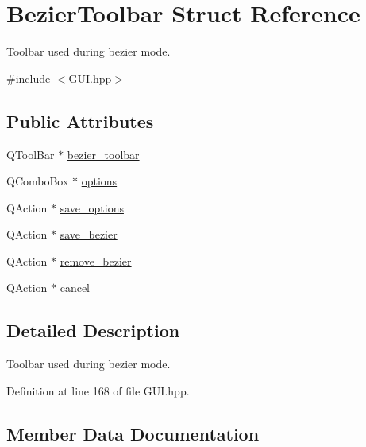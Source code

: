 \hypertarget{structBezierToolbar}{}\section{Bezier\+Toolbar Struct Reference}
\label{structBezierToolbar}


Toolbar used during bezier mode.  




{\ttfamily \#include $<$G\+U\+I.\+hpp$>$}

\subsection*{Public Attributes}
\begin{DoxyCompactItemize}
\item 
Q\+Tool\+Bar $\ast$ \mbox{\hyperlink{structBezierToolbar_a50604dd32265111bdef282bac1bd506c}{bezier\+\_\+toolbar}}
\item 
Q\+Combo\+Box $\ast$ \mbox{\hyperlink{structBezierToolbar_a84666bca25e5b6c194adaf0461c30ec3}{options}}
\item 
Q\+Action $\ast$ \mbox{\hyperlink{structBezierToolbar_a9d3e4ffe8c28b246dafd257110e28994}{save\+\_\+options}}
\item 
Q\+Action $\ast$ \mbox{\hyperlink{structBezierToolbar_a2848e3a1e3d0eb3dfe63959c12538782}{save\+\_\+bezier}}
\item 
Q\+Action $\ast$ \mbox{\hyperlink{structBezierToolbar_a1e1fd77e3baf09d382973b1ede4247cd}{remove\+\_\+bezier}}
\item 
Q\+Action $\ast$ \mbox{\hyperlink{structBezierToolbar_a5c91775ecfd6725f3707b5b838bcbbf9}{cancel}}
\end{DoxyCompactItemize}


\subsection{Detailed Description}
Toolbar used during bezier mode. 

Definition at line 168 of file G\+U\+I.\+hpp.



\subsection{Member Data Documentation}
\mbox{\label{structBezierToolbar_a50604dd32265111bdef282bac1bd506c}} 
